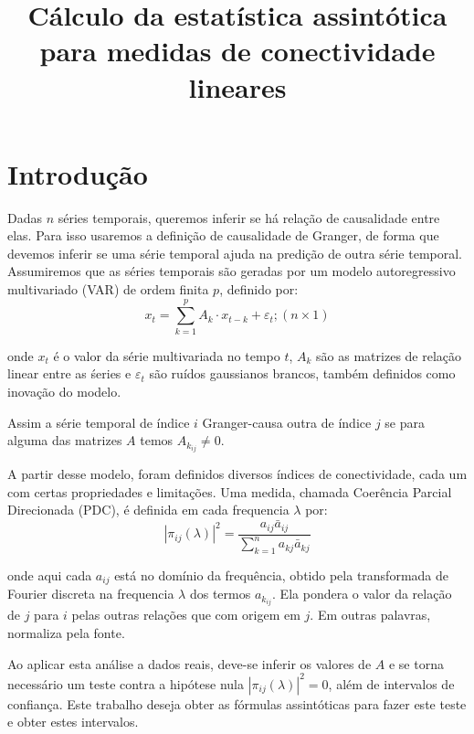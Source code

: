 \documentclass[a4paper,10pt]{article}
\title{Cálculo da estatística assintótica para medidas de conectividade lineares}
\author{}
\begin{document}
\maketitle

\begin{abstract}

\end{abstract}

\section{Introdução}

Dadas $n$ séries temporais, queremos inferir se há relação de causalidade entre elas. Para isso usaremos a definição de causalidade de Granger, de forma que devemos inferir se uma série temporal ajuda na predição de outra série temporal. Assumiremos que as séries temporais são geradas por um modelo autoregressivo multivariado (VAR) de ordem finita $p$, definido por:
\begin{equation}
x_{t} = \sum_{k=1}^{p}{A_{k}\cdot x_{t-k}} + \varepsilon_{t}; (n \times 1)
\end{equation}

onde $x_{t}$ é o valor da série multivariada no tempo $t$, $A_k$ são as matrizes de relação linear entre as śeries e $\varepsilon_{t}$ são ruídos gaussianos brancos, também definidos como inovação do modelo.

Assim a série temporal de índice $i$ Granger-causa outra de índice $j$ se para alguma das matrizes $A$ temos $A_{k_{ij}} \neq 0$. 

A partir desse modelo, foram definidos diversos índices de conectividade, cada um com certas propriedades e limitações. Uma medida, chamada Coerência Parcial Direcionada (PDC), é definida em cada frequencia $\lambda$ por:
\begin{equation}
|\pi_{ij}(\lambda)|^{2} = \frac{a_{ij} \bar{a}_{ij}}{\sum_{k=1}^{n}{a_{kj} \bar{a}_{kj}}}  
\end{equation}


onde aqui cada $a_{ij}$ está no domínio da frequência, obtido pela transformada de Fourier discreta na frequencia $\lambda$ dos termos $a_{k_{ij}}$. Ela pondera o valor da relação de $j$ para $i$ pelas outras relações que com origem em $j$. Em outras palavras, normaliza pela fonte.

Ao aplicar esta análise a dados reais, deve-se inferir os valores de $A$ e se torna necessário um teste contra a hipótese nula $ |\pi_{ij}(\lambda)|^{2} = 0$, além de intervalos de confiança. Este trabalho deseja obter as fórmulas assintóticas para fazer este teste e obter estes intervalos.
\end{document}
